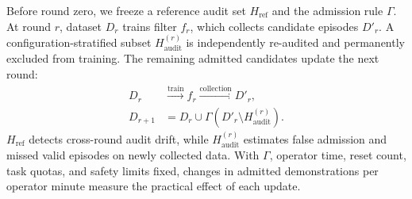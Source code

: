 Before round zero, we freeze a reference audit set $H_{\mathrm{ref}}$ and the
admission rule $\Gamma$. At round $r$, dataset $D_r$ trains filter $f_r$, which
collects candidate episodes $D'_r$. A configuration-stratified subset
$H^{(r)}_{\mathrm{audit}}$ is independently re-audited and permanently excluded
from training. The remaining admitted candidates update the next round:
\begin{equation}
\begin{split}
  D_r &\xrightarrow{\mathrm{train}} f_r
  \xrightarrow{\mathrm{collection}} D'_r,\\
  D_{r+1} &=D_r\cup
  \Gamma\!\left(D'_r\setminus H^{(r)}_{\mathrm{audit}}\right).
  \label{eq:flywheel}
\end{split}
\end{equation}
$H_{\mathrm{ref}}$ detects cross-round audit drift, while
$H^{(r)}_{\mathrm{audit}}$ estimates false admission and missed valid episodes
on newly collected data. With $\Gamma$, operator time, reset count, task quotas,
and safety limits fixed, changes in admitted demonstrations per operator minute
measure the practical effect of each update.
